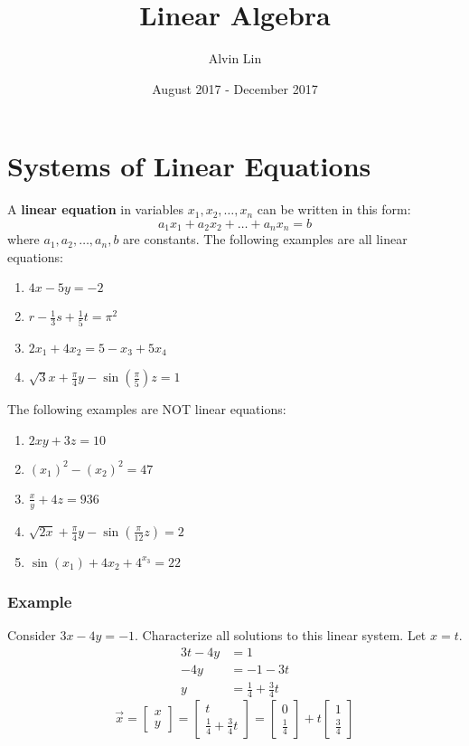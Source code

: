 \documentclass[letterpaper, 12pt]{math}
\title{Linear Algebra}
\author{Alvin Lin}
\date{August 2017 - December 2017}
\begin{document}
\maketitle

\section*{Systems of Linear Equations}
A \textbf{linear equation} in variables \( x_1,x_2,\dots,x_n \) can be written
in this form:
\[ a_1x_1+a_2x_2+\dots+a_nx_n = b \]
where \( a_1,a_2,\dots,a_n,b \) are constants. The following examples are all
linear equations:
\begin{enumerate}
  \item \( 4x-5y = -2 \)
  \item \( r-\frac{1}{3}s+\frac{1}{5}t = \pi^2 \)
  \item \( 2x_1+4x_2 = 5-x_3+5x_4 \)
  \item \( \sqrt{3}x+\frac{\pi}{4}y-\sin(\frac{\pi}{5})z = 1 \)
\end{enumerate}
The following examples are NOT linear equations:
\begin{enumerate}
  \item \( 2xy+3z = 10 \)
  \item \( (x_1)^2-(x_2)^2 = 47 \)
  \item \( \frac{x}{y}+4z = 936 \)
  \item \( \sqrt{2x}+\frac{\pi}{4}y-\sin(\frac{\pi}{12}z) = 2 \)
  \item \( \sin(x_1)+4x_2+4^{x_3} = 22 \)
\end{enumerate}

\subsubsection*{Example}
Consider \( 3x-4y = -1 \). Characterize all solutions to this linear system.
Let \( x = t \).
\begin{align*}
  3t-4y &= 1 \\
  -4y &= -1-3t \\
  y &= \frac{1}{4}+\frac{3}{4}t
\end{align*}
\[ \vec{x} = \begin{bmatrix}x \\ y\end{bmatrix} =
  \begin{bmatrix}t \\ \frac{1}{4}+\frac{3}{4}t\end{bmatrix} =
  \begin{bmatrix}0 \\ \frac{1}{4}\end{bmatrix}+
  t\begin{bmatrix}1 \\ \frac{3}{4}\end{bmatrix} \]
\end{document}
